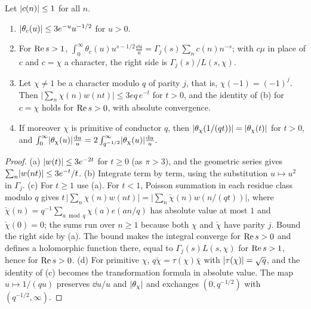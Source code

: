 \begin{lemma}\label{lem:B-theta}
Let $\lvert c(n)\rvert\le1$ for all $n$.
\begin{enumerate}[label=\textup{(\alph*)}]
\item $\lvert \theta_c(u)\rvert\le3e^{-u}u^{-1/2}$ for $u>0$.
\item For $\operatorname{Re} s>1$, $\int_0^\infty\theta_c(u)u^{s-1/2}\frac{\dd u}u=\Gamma_j(s)\sum_nc(n)n^{-s}$; with
$c\mu$ in place of $c$ and $c=\chi$ a character, the right side is $\Gamma_j(s)/L(s,\chi)$.
\item Let $\chi\ne1$ be a character modulo $q$ of parity $j$, that is, $\chi(-1)=(-1)^j$. Then
$\bigl\lvert\sum_n\chi(n)w(nt)\bigr\rvert\le3eq\,e^{-t}$ for $t>0$, and the identity of (b) for $c=\chi$
holds for $\operatorname{Re} s>0$, with absolute convergence.
\item If moreover $\chi$ is primitive of conductor $q$, then $\lvert \theta_\chi(1/(qt))\rvert=\lvert \theta_\chi(t)\rvert$
for $t>0$, and
$\int_0^\infty\lvert \theta_\chi(u)\rvert\frac{\mathop{}\!\mathrm{d} u}u=2\int_{q^{-1/2}}^\infty\lvert \theta_\chi(u)\rvert\frac{\mathop{}\!\mathrm{d} u}u$.
\end{enumerate}
\end{lemma}

\begin{proof}
(a) $\lvert w(t)\rvert\le3e^{-2t}$ for $t\ge0$ (as $\pi>3$), and the geometric series gives
$\sum_n\lvert w(nt)\rvert\le3e^{-t}/t$. (b) Integrate term by term, using the substitution $u\mapsto u^2$ in
$\Gamma_j$. (c) For $t\ge1$ use (a). For $t<1$, Poisson summation in each residue class modulo $q$ gives
$t\,\bigl\lvert\sum_n\chi(n)w(nt)\bigr\rvert=\bigl\lvert\sum_n\check\chi(n)w(n/(qt))\bigr\rvert$, where
$\check\chi(n)=q^{-1}\sum_{a\bmod q}\chi(a)e(an/q)$ has absolute value at most $1$ and $\check\chi(0)=0$;
the sums run over $n\ge1$ because both $\chi$ and $\check\chi$ have parity $j$. Bound the right side by
(a). The bound makes the integral converge for $\operatorname{Re} s>0$ and defines a holomorphic function there,
equal to $\Gamma_j(s)L(s,\chi)$ for $\operatorname{Re} s>1$, hence for $\operatorname{Re} s>0$. (d) For primitive $\chi$,
$q\check\chi=\tau(\chi)\bar\chi$ with $\lvert \tau(\chi)\rvert=\sqrt q$, and the identity of (c) becomes the
transformation formula in absolute value. The map $u\mapsto1/(qu)$ preserves $\dd u/u$ and $\lvert \theta_\chi\rvert$
and exchanges $(0,q^{-1/2})$ with $(q^{-1/2},\infty)$.
\end{proof}

